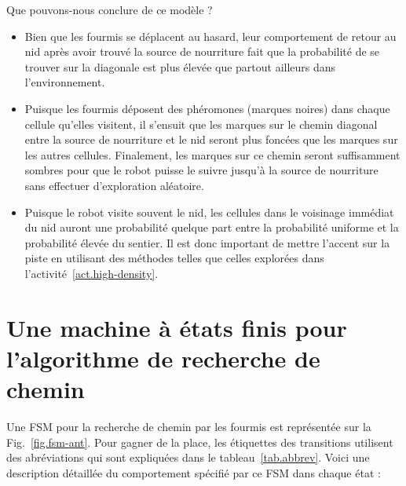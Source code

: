 Que pouvons-nous conclure de ce modèle ?
\begin{itemize}
\item Bien que les fourmis se déplacent au hasard, leur comportement de retour au nid après avoir trouvé la source de nourriture fait que la probabilité de se trouver sur la diagonale est plus élevée que partout ailleurs dans l'environnement. 
\item Puisque les fourmis déposent des phéromones (marques noires) dans chaque cellule qu'elles visitent, il s'ensuit que les marques sur le chemin diagonal entre la source de nourriture et le nid seront plus foncées que les marques sur les autres cellules. Finalement, les marques sur ce chemin seront suffisamment sombres pour que le robot puisse le suivre jusqu'à la source de nourriture sans effectuer d'exploration aléatoire.
\item Puisque le robot visite souvent le nid, les cellules dans le voisinage immédiat du nid auront une probabilité quelque part entre la probabilité uniforme et la probabilité élevée du sentier. Il est donc important de mettre l'accent sur la piste en utilisant des méthodes telles que celles explorées dans l'activité~\ref{act.high-density}.
\end{itemize}

\section[Une machine pour la recherche de chemin]{Une machine à états finis pour l'algorithme de recherche de chemin}\label{s.fsm-ants}

Une FSM pour la recherche de chemin par les fourmis est représentée sur la Fig.~\ref{fig.fsm-ant}. Pour gagner de la place, les étiquettes des transitions utilisent des abréviations qui sont expliquées dans le tableau~\ref{tab.abbrev}. Voici une description détaillée du comportement spécifié par ce FSM dans chaque état :

\smallskip

